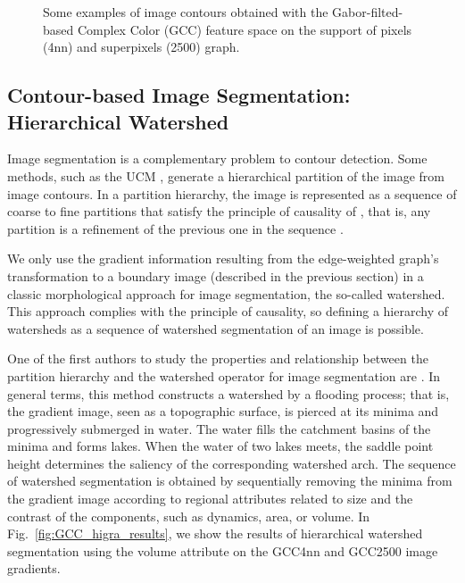 \begin{figure}[!ht]
	\caption{Some examples of image contours obtained with the Gabor-filted-based Complex Color (GCC) feature space on the support of pixels (4nn) and superpixels (2500) graph.}\label{fig:GCC_results}    
\end{figure}


\subsection{Contour-based Image Segmentation: Hierarchical Watershed}

Image segmentation is a complementary problem to contour detection. Some methods, such as the UCM \citep{Arbelaez.Maire.ea:PR:2009}, generate a hierarchical partition of the image from image contours. In a partition hierarchy, the image is represented as a sequence of coarse to fine partitions that satisfy the principle of causality of \cite{Koenderink:BC:1984}, that is, any partition is a refinement of the previous one in the sequence \citep{Perret.Cousty.ea:TIP:2018}.

We only use the gradient information resulting from the edge-weighted graph's transformation to a boundary image (described in the previous section) in a classic morphological approach for image segmentation, the so-called watershed. This approach complies with the principle of causality, so defining a hierarchy of watersheds as a sequence of watershed segmentation of an image is possible. 

One of the first authors to study the properties and relationship between the partition hierarchy and the watershed operator for image segmentation are \citep{Najman.Schmitt:PAMI:1996}. In general terms, this method constructs a watershed by a flooding process; that is, the gradient image, seen as a topographic surface, is pierced at its minima and progressively submerged in water. The water fills the catchment basins of the minima and forms lakes. When the water of two lakes meets, the saddle point height determines the saliency of the corresponding watershed arch. The sequence of watershed segmentation is obtained by sequentially removing the minima from the gradient image according to regional attributes related to size and the contrast of the components, such as dynamics, area, or volume. In Fig.\ \ref{fig:GCC_higra_results}, we show the results of hierarchical watershed segmentation using the volume attribute on the GCC4nn and GCC2500 image gradients. 

